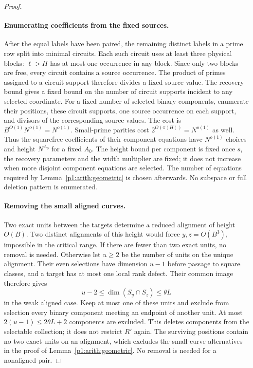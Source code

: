\begin{proof}
\paragraph{Enumerating coefficients from the fixed sources.}
After the equal labels have been paired, the remaining distinct labels
in a prime row split into minimal circuits. Each such circuit uses at
least three physical blocks: $\ell>H$ has at most one occurrence in
any block. Since only two blocks are free, every circuit contains a
source occurrence. The product of primes assigned to a circuit support
therefore divides a fixed source value.
The recovery bound gives a fixed bound on the number of circuit supports
incident to any selected coordinate. For a fixed number of selected
binary components, enumerate their positions, these circuit supports,
one source occurrence on each support, and divisors of the corresponding
source values. The cost is
$B^{O(1)}N^{o(1)}=N^{o(1)}$. Small-prime parities cost
$2^{O(\pi(H))}=N^{o(1)}$ as well. Thus the squarefree coefficients
of their component equations have $N^{o(1)}$ choices and height
$N^{A_0}$ for a fixed $A_0$. The height bound per component is fixed
once $s$, the recovery parameters and the width multiplier are fixed;
it does not increase when more disjoint component equations are selected.
The number of equations required by Lemma~\ref{p1:arith:geometric}
is chosen afterwards. No subspace or full deletion pattern is enumerated.

\paragraph{Removing the small aligned curves.}
Two exact units between the targets determine a reduced alignment of
height $O(B)$. Two distinct alignments of this height would force
$y,z=O(B^3)$, impossible in the critical range. If there are fewer than
two exact units, no removal is needed. Otherwise let $u\geq2$ be the
number of units on the unique alignment. Their even selections have dimension
$u-1$ before passage to square classes, and a target has at most one
local rank defect. Their common image therefore gives
\[
 u-2\leq\dim(S_y\cap S_z)\leq\theta L
\]
in the weak aligned case. Keep at most one of these units and exclude
from selection every binary component meeting an endpoint of another
unit. At most $2(u-1)\leq2\theta L+2$ components are excluded.
This deletes components from the selectable collection; it does not
restrict $R'$ again. The surviving positions contain no two exact units
on an alignment, which excludes the small-curve alternatives in the
proof of Lemma~\ref{p1:arith:geometric}. No removal is needed for a
nonaligned pair.


\end{proof}
